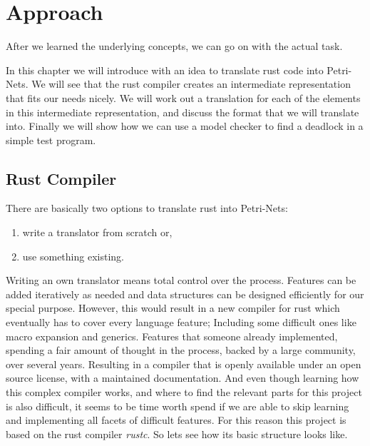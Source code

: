 \chapter{Approach}
\label{approach}
After we learned the underlying concepts, we can go on with the actual task.

In this chapter we will introduce with an idea to translate rust code into Petri-Nets.
We will see that the rust compiler creates an intermediate representation that fits our needs nicely.
We will work out a translation for each of the elements in this intermediate representation, and discuss the format that we will translate into.
Finally we will show how we can use a model checker to find a deadlock in a simple test program.

\section{Rust Compiler}
\label{app_rust}
There are basically two options to translate rust into Petri-Nets:
\begin{enumerate}
    \item write a translator from scratch or,
    \item use something existing.
\end{enumerate}
Writing an own translator means total control over the process.
Features can be added iteratively as needed and data structures can be designed efficiently for our special purpose.
However, this would result in a new compiler for rust which eventually has to cover every language feature;
Including some difficult ones like macro expansion and generics.
Features that someone already implemented, spending a fair amount of thought in the process,
backed by a large community,
over several years.
Resulting in a compiler that is openly available under an open source license\cite{rustc}, with a maintained documentation\cite{rustc-guide}\cite{rustc-doc}.
And even though learning how this complex compiler works, and where to find the relevant parts for this project is also difficult, it seems to be time worth spend if we are able to skip learning and implementing all facets of difficult features.
For this reason this project is based on the rust compiler \textit{rustc}.
So lets see how its basic structure looks like.

